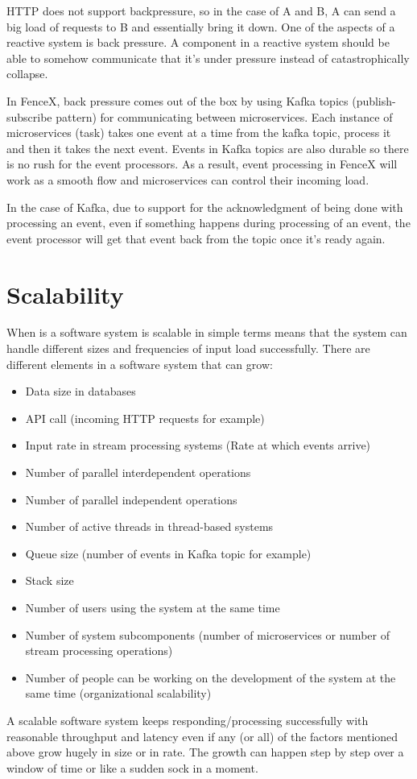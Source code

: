 \documentclass[a4]{report}
\begin{document}
    HTTP does not support backpressure, so in the case of A and B, A can send a big load of requests to B and
    essentially bring it down.
    One of the aspects of a reactive system is back pressure.
    A component in a reactive system should be able to somehow communicate that it's under pressure instead of catastrophically collapse.

    In FenceX, back pressure comes out of the box by using Kafka topics (publish-subscribe pattern) for communicating
    between microservices.
    Each instance of microservices (task) takes one event at a time from the kafka topic, process it and then it takes
    the next event.
    Events in Kafka topics are also durable so there is no rush for the event processors.
    As a result, event processing in FenceX will work as a smooth flow and microservices can control their incoming load.

    In the case of Kafka, due to support for the acknowledgment of being done with processing an event, even if
    something happens during processing of an event, the event processor will get that event back from the topic once it's
    ready again.


    \section{Scalability}
    When is a software system is scalable in simple terms means that the system can handle different sizes and frequencies of
    input load successfully.
    There are different elements in a software system that can grow:
    \begin{itemize}
        \item Data size in databases
        \item API call (incoming HTTP requests for example)
        \item Input rate in stream processing systems (Rate at which events arrive)
        \item Number of parallel interdependent operations
        \item Number of parallel independent operations
        \item Number of active threads in thread-based systems
        \item Queue size (number of events in Kafka topic for example)
        \item Stack size
        \item Number of users using the system at the same time
        \item Number of system subcomponents (number of microservices or number of stream processing operations)
        \item Number of people can be working on the development of the system at the same time (organizational scalability)
    \end{itemize}
    A scalable software system keeps responding/processing successfully with reasonable throughput and latency even if
    any (or all) of the factors mentioned above grow hugely in size or in rate.
    The growth can happen step by step over a window of time or like a sudden sock in a moment.
\end{document}
